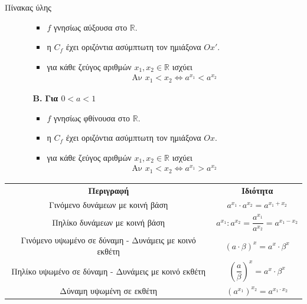 \documentclass[twoside,nofonts,internet,math,spyros]{frontisthrio}
\begin{document}
\begin{mybox}[mysubtitle]{Πίνακας ύλης}
\begin{multicols}{2}
\begin{enumerate}[itemsep=0mm,leftmargin=3mm]
\begin{enumerate}[itemsep=0mm,label=\bf\arabic*.,leftmargin=0cm]
\begin{itemize}[leftmargin=4mm]
\item $ f $ γνησίως αύξουσα στο $ \mathbb{R} $.
\item η $ C_f $ έχει οριζόντια ασύμπτωτη τον ημιάξονα $ Οx' $.
\item για κάθε ζεύγος αριθμών $ x_1,x_2\in\mathbb{R} $ ισχύει 
\begin{gather*}
\textrm{Αν }x_1<x_2\Leftrightarrow a^{x_1}<a^{x_2}
\end{gather*}
\end{itemize}
\item[\textbf{B.}] \textbf{Για {\boldmath$ 0<a<1 $}}
\begin{itemize}[leftmargin=4mm]
\item $ f $ γνησίως φθίνουσα στο $ \mathbb{R} $.
\item η $ C_f $ έχει οριζόντια ασύμπτωτη τον ημιάξονα $ Οx $.
\item για κάθε ζεύγος αριθμών $ x_1,x_2\in\mathbb{R} $ ισχύει 
\begin{gather*}
\textrm{Αν }x_1<x_2\Leftrightarrow a^{x_1}>a^{x_2}
\end{gather*}
\end{itemize}
\end{enumerate}
\end{enumerate}
\end{multicols}
\begin{center}
\begin{tabular}{cc}
\hline
\rule[-2ex]{0pt}{5ex} \textbf{Περιγραφή} & \textbf{Ιδιότητα} \\
\hhline{==}
\rule[-2ex]{0pt}{5ex} Γινόμενο δυνάμεων με κοινή βάση & $ a^{x_1}\cdot a^{x_2}=a^{x_1+x_2} $ \\
\rule[-2ex]{0pt}{5.5ex} Πηλίκο δυνάμεων με κοινή βάση & $ a^{x_1}:a^{x_2}=\dfrac{a^{x_1}}{a^{x_2}}=a^{x_1-x_2} $ \\
\rule[-2ex]{0pt}{5ex} Γινόμενο υψωμένο σε δύναμη - Δυνάμεις με κοινό εκθέτη & $ (a\cdot \beta)^x=a^x\cdot \beta^x $ \\
\rule[-2ex]{0pt}{5.5ex}  Πηλίκο υψωμένο σε δύναμη - Δυνάμεις με κοινό εκθέτη & $ \left(\dfrac{a}{\beta}\right)^x=a^x\cdot \beta^x $  \\
\rule[-2ex]{0pt}{5ex} Δύναμη υψωμένη σε εκθέτη  & $ \left(a^{x_1}\right)^{x_2}=a^{x_1\cdot x_2} $ \\
\hline
\end{tabular}
\end{center}

\end{mybox}
\end{document}
